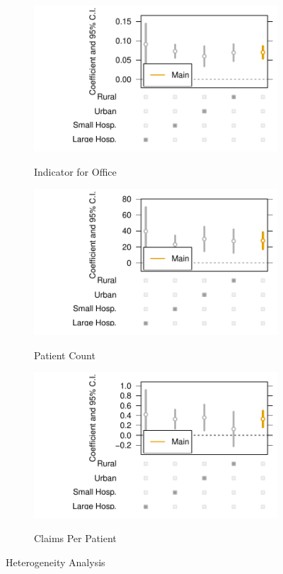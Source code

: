 \documentclass[12pt]{article}
\begin{document}
\begin{figure}[t!]
\medskip
\begin{subfigure}{0.48\textwidth}
\caption{Indicator for Office }
\includegraphics[width=\linewidth]{Objects/office_ind_heterog.pdf}
 \label{fig:c}
\end{subfigure}\hspace*{\fill}
\begin{subfigure}{0.48\textwidth}
\caption{Patient Count} 
\includegraphics[width=\linewidth]{Objects/patient_heterog.pdf}
\label{fig:d}
\end{subfigure}

\medskip
\begin{subfigure}{0.48\textwidth}
\caption{Claims Per Patient} 
\includegraphics[width=\linewidth]{Objects/claim_per_patient_heterog.pdf}
\label{fig:e}
\end{subfigure}\hspace*{\fill}

\caption{Heterogeneity Analysis} \label{fig:1}
\end{figure}
\end{document}
